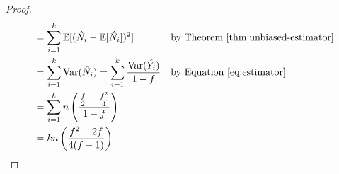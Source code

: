\documentclass{article}
\begin{document}
\begin{enumerate}
\begin{proof}
\begin{align*}
			&= \sum\limits_{i=1}^k\mathbb{E}[(\hat{N_i}-\mathbb{E}[\hat{N_i}])^2] && \text{by Theorem~\ref{thm:unbiased-estimator}}\\
			&= \sum\limits_{i=1}^k\text{Var}(\hat{N_i}) = \sum\limits_{i=1}^k\frac{\text{Var}(\hat{Y_i})}{1-f}&&\text{by Equation~\ref{eq:estimator}}\\
			&= \sum\limits_{i=1}^kn\left(\frac{\frac{f}{2}-\frac{f^2}{4}}{1-f}\right) &&\\
			&= kn\left(\frac{f^2-2f}{4(f-1)}\right)
	\end{align*}
	
\end{proof}
\end{enumerate}



\end{document}
